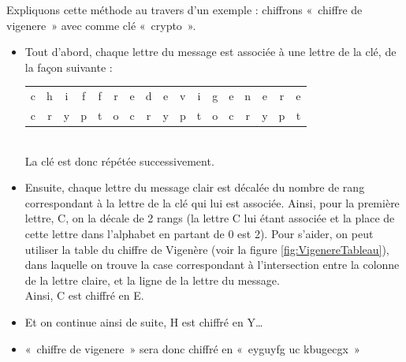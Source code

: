 Expliquons cette méthode au travers d'un exemple : chiffrons «~chiffre
de vigenere~» avec comme clé «~crypto~».
\begin{itemize}
  \item Tout d'abord, chaque lettre du message est associée à une
    lettre de la clé, de la façon suivante : \\
    \begin{tabular}{c@{}c@{}c@{}c@{}c@{}c@{}cc@{}cc@{}c@{}c@{}c@{}c@{}c@{}c@{}c}
      c & h & i & f & f & r & e &
      d & e &
      v & i & g & e & n & e & r & e \\

      c & r & y & p & t & o & c & 
      r & y & 
      p & t & o & c & r & y & p & t \\
    \end{tabular}\\
    La clé est donc répétée successivement.
  \item Ensuite, chaque lettre du message clair est décalée du nombre
    de rang correspondant à la lettre de la clé qui lui est
    associée. Ainsi, pour la première lettre, C, on la décale de 2
    rangs (la lettre C lui étant associée et la place de cette lettre
    dans l'alphabet en partant de 0 est 2). Pour s'aider, on peut
    utiliser la table du chiffre de Vigenère (voir la figure
    \ref{fig:VigenereTableau}), dans laquelle on trouve la case
correspondant à l'intersection entre la colonne de la lettre
claire, et la ligne de la lettre du message. \\
    Ainsi, C est chiffré en E.
  \item Et on continue ainsi de suite, H est chiffré en Y\dots
  \item «~chiffre de vigenere~» sera donc chiffré en «~eyguyfg uc
    kbugecgx~»
\end{itemize}

